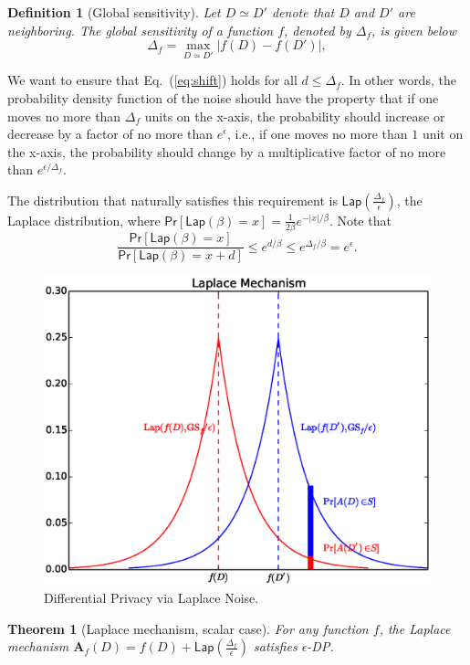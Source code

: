\documentclass{article}
\renewcommand{\AA}{\mathbf{A}}
\newtheorem{theorem}{Theorem}
\newtheorem{definition}{Definition}
\renewcommand{\Pr}[1]{\ensuremath{\mathsf{Pr}\left[#1\right]}\xspace}
\begin{document}
\begin{definition}[Global sensitivity]
	Let $D\simeq D'$ denote that $D$ and $D'$ are neighboring.
	The global sensitivity of a function $f$, denoted by $\Delta_f$, is given below
	\begin{equation}\label{eq:globalsensitivity}
	\Delta_f  = \max_{D\simeq D'} |f(D) - f(D')|,
	\end{equation}
\end{definition}
We want to ensure that Eq.~(\ref{eq:shift}) holds for all $d \leq \Delta_f$.  In other words, the probability density function of the noise should have the property that if one moves no more than $\Delta_f$ units on the x-axis, the probability should increase or decrease by a factor of no more than $e^{\epsilon}$, i.e., if one moves no more than $1$ unit on the x-axis, the probability should change by a multiplicative factor of no more than $e^{\epsilon/\Delta_f}$.


The distribution that naturally satisfies this requirement is $\mathsf{Lap}\left(\frac{\Delta_f}{\epsilon}\right)$, the Laplace distribution,
where $\Pr{\mathsf{Lap}(\beta)=x} = \frac{1}{2\beta} e^{-|x|/\beta}$.
Note that
$$\frac{\Pr{\mathsf{Lap}(\beta) = x}}{\Pr{\mathsf{Lap}(\beta) = x + d}} \leq e^{d/\beta} \leq e^{\Delta_f/\beta} = e^{\epsilon}.$$

\begin{figure}[!htb]
	\centering
	\includegraphics[width=5.0in]{lap.eps}
	\caption{Differential Privacy via Laplace Noise.\label{fig:laplaceMechanism}}
\end{figure}

\begin{theorem}[Laplace mechanism, scalar case]\label{thm:lap_scalar}
	For any function $f$, the Laplace mechanism $\AA_f(D)  = f(D)+\mathsf{Lap}\left(\frac{\Delta_f}{\epsilon}\right)$ satisfies $\epsilon$-DP.
\end{theorem}
\end{document}
